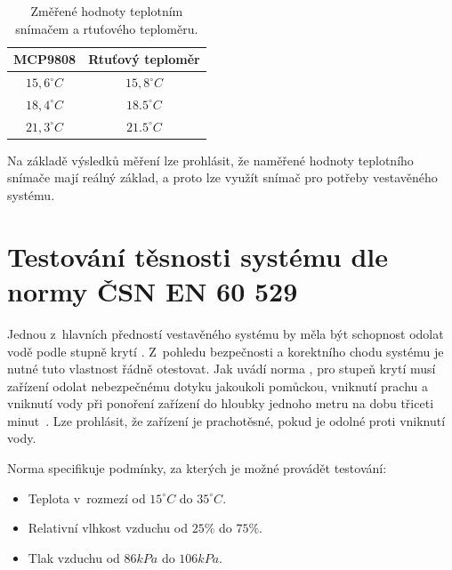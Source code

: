             \begin{table}[h]\centering
                \begin{tabular}{@{}cc@{}}
                    \toprule
                    \textbf{MCP9808}    & \textbf{Rtuťový teploměr}\\
                    \midrule
                    $15,6^\circ\unit{C}$ & $15,8^\circ\unit{C}$\\
                    $18,4^\circ\unit{C}$ & $18.5^\circ\unit{C}$\\
                    $21,3^\circ\unit{C}$ & $21.5^\circ\unit{C}$\\
                    \bottomrule
                \end{tabular}
                \caption{Změřené hodnoty teplotním snímačem  a rtuťového teploměru.}
                \label{table:temp_m}
            \end{table}

             Na základě výsledků měření lze prohlásit, že naměřené hodnoty teplotního snímače  mají reálný základ, a proto lze využít snímač pro potřeby vestavěného systému.
    
    \section{Testování těsnosti systému dle normy ČSN EN 60 529}
        Jednou z~hlavních předností vestavěného systému by měla být schopnost odolat vodě podle stupně krytí . Z~pohledu bezpečnosti a korektního chodu systému je nutné tuto vlastnost řádně otestovat. Jak uvádí norma , pro stupeň krytí  musí zařízení odolat nebezpečnému dotyku jakoukoli pomůckou, vniknutí prachu a vniknutí vody při ponoření zařízení do hloubky jednoho metru na dobu třiceti minut~\cite{csn}. Lze prohlásit, že zařízení je prachotěsné, pokud je odolné proti vniknutí vody.

        Norma specifikuje podmínky, za kterých je možné provádět testování:
        \begin{itemize}
            \item Teplota v~rozmezí od $15^\circ\unit{C}$ do $35^\circ\unit{C}$.
            \item Relativní vlhkost vzduchu od $25\unit{\%}$ do $75\unit{\%}$.
            \item Tlak vzduchu od $86\unit{kPa}$ do $106\unit{kPa}$.
        \end{itemize}

